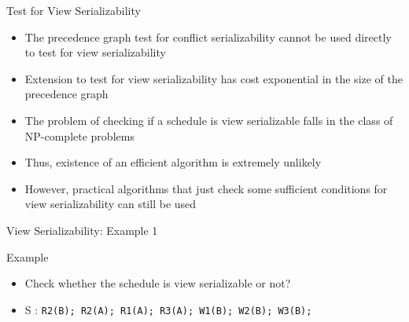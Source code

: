 \documentclass[aspectratio=169, xcolor=dvipsnames]{beamer}
\begin{document}
\begin{frame}{Test for View Serializability}
    \begin{itemize}[<+->]
        \item The precedence graph test for conflict serializability cannot be used directly to test for view serializability
        \item Extension to test for view serializability has cost exponential in the size of the precedence graph
        \item The problem of checking if a schedule is view serializable falls in the class of NP-complete problems
        \item Thus, existence of an efficient algorithm is extremely unlikely
        \item However, practical algorithms that just check some sufficient conditions for view serializability can still be used
    \end{itemize}
\end{frame}

\begin{frame}{View Serializability: Example 1}
    \begin{exampleblock}{Example}
        \begin{itemize}[<+->]
            \item Check whether the schedule is view serializable or not?
            \item S : \texttt{R2(B); R2(A); R1(A); R3(A); W1(B); W2(B); W3(B);}
        \end{itemize}
    \end{exampleblock}
\end{frame}
\end{document}

